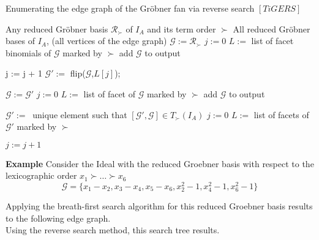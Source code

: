 \begin{algorithm}
\caption{Enumerating the edge graph of the Gröbner fan via reverse search $\left[ TiGERS\right]  $}
\label{reverse-alg}
\begin{algorithmic}[1]

\Require
Any reduced Gröbner basis $ \mathcal{R}_{\succ} $ of $I_A$ and its term order $\succ$
\Ensure All reduced Gröbner bases of $I_A$, (all vertices of the edge graph)
\State $\mathcal{G} := \mathcal{R}_{\succ} $
\State $j := 0$
\State $L := $ list of facet binomials of $\mathcal{G}$ marked by $\succ$
\State add $\mathcal{G}$ to output
\Repeat
{}

\State j := j + 1
\State $\mathcal{G}':= $ flip($\mathcal{G}$,$L[j]$);

\State $\mathcal{G} := \mathcal{G}' $  
\State $ j := 0$
\State $ L := $ list of facet of $\mathcal{G}$ marked by $\succ$
\State add $ \mathcal{G}$ to output

\EndIf 

\EndWhile

\State $\mathcal{G}' :=~$ unique element such that $[\mathcal{G}',\mathcal{G}] \in T_{\succ}(I_{A}) $
\State $j := 0$
\State $L := $ list of facets of $\mathcal{G}'$ marked by $\succ$

\Repeat
\State $j := j + 1$

\EndIf



\end{algorithmic}
\end{algorithm}

\textbf{Example}
Consider the Ideal with the reduced Groebner basis with respect to the lexicographic order $x_{1} \succ \ldots \succ x_{6} $
\[ \mathcal{G} = \{x_{1} - x_{2}, x_{3} - x_{4}, x_{5}-x_{6} , x_{2}^{2} -1 , x_{4}^{2} - 1, x_{6}^{2} - 1 \} \]

Applying the breath-first search algorithm for this reduced Groebner basis results to the following edge graph.\\


Using the reverse search method, this search tree results.


